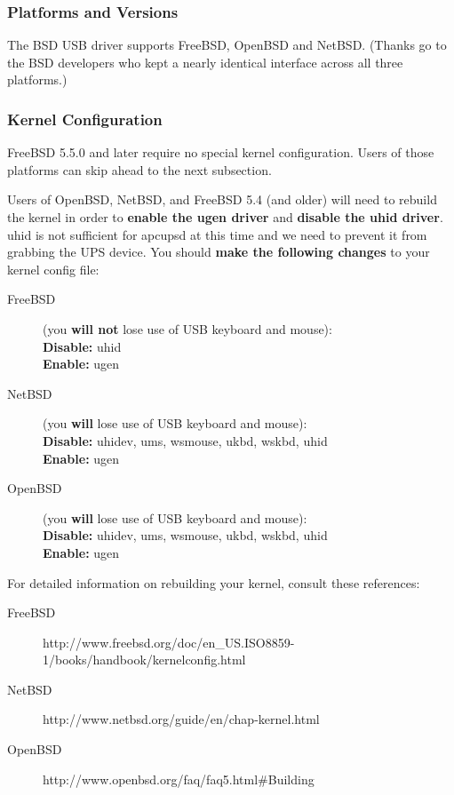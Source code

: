 \subsubsection*{Platforms and Versions}

The \*BSD USB driver supports FreeBSD, OpenBSD and NetBSD. (Thanks go to 
the \*BSD developers who kept a nearly identical interface across all 
three platforms.)

\subsubsection*{Kernel Configuration}

FreeBSD 5.5.0 and later require no special kernel configuration. Users of
those platforms can skip ahead to the next subsection.

Users of OpenBSD, NetBSD, and FreeBSD 5.4 (and older) will need to rebuild
the kernel in order to {\bf enable the ugen driver} and {\bf disable the 
uhid driver}. uhid is not sufficient for apcupsd at this time and we need 
to prevent it from grabbing the UPS device. You should {\bf make the 
following changes} to your kernel config file:

\begin{description}
\item [FreeBSD]
(you {\bf will not} lose use of USB keyboard and mouse):
\\{\bf Disable:} uhid
\\{\bf Enable:} ugen

\item [NetBSD] (you {\bf will} lose use of USB keyboard and mouse):
\\{\bf Disable:} uhidev, ums, wsmouse, ukbd, wskbd, uhid  
\\{\bf Enable:} ugen

\item [OpenBSD] (you {\bf will} lose use of USB keyboard and mouse):
\\{\bf Disable:} uhidev, ums, wsmouse, ukbd, wskbd, uhid  
\\{\bf Enable:} ugen
\end{description}

For detailed information on rebuilding your kernel, consult these references: 

\begin{description}
\item [FreeBSD]
      {http://www.freebsd.org/doc/en\_US.ISO8859-1/books/handbook/kernelconfig.html}
\item [NetBSD]
      {http://www.netbsd.org/guide/en/chap-kernel.html}
\item [OpenBSD]
      {http://www.openbsd.org/faq/faq5.html\#Building}
\end{description}

